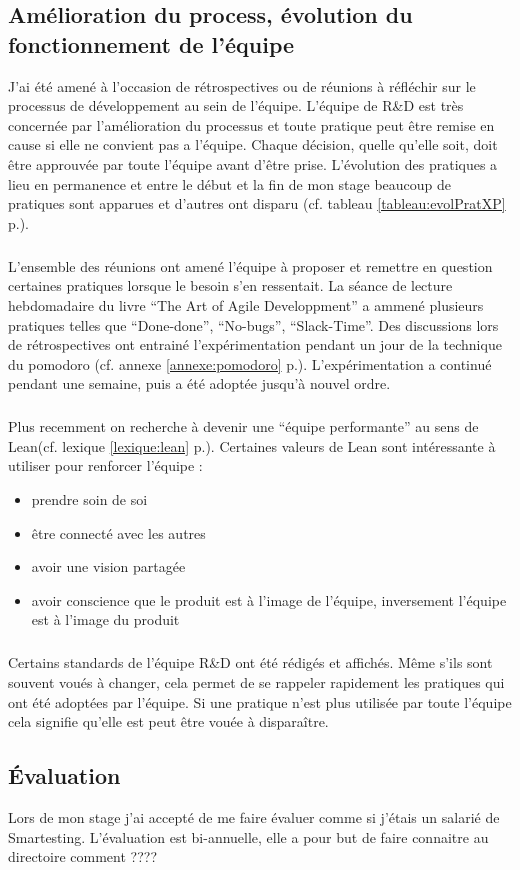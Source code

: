 \subsection{Amélioration du process, évolution du fonctionnement de l'équipe}
J'ai été amené à l'occasion de rétrospectives ou de réunions à réfléchir sur le processus de développement au sein de l'équipe. L'équipe de R\&D est très concernée par l'amélioration du processus et toute pratique peut être remise en cause si elle ne convient pas a l'équipe. Chaque décision, quelle qu'elle soit, doit être approuvée par toute l'équipe avant d'être prise. L'évolution des pratiques a lieu en permanence et entre le début et la fin de mon stage beaucoup de pratiques sont apparues et d'autres ont disparu (cf. tableau \ref{tableau:evolPratXP} p.\pageref{tableau:evolPratXP}).
\subparagraph*{}
L'ensemble des réunions ont amené l'équipe à proposer et remettre en question certaines pratiques lorsque le besoin s'en ressentait. La séance de lecture hebdomadaire du livre ``The Art of Agile Developpment'' a ammené plusieurs pratiques telles que ``Done-done'', ``No-bugs'', ``Slack-Time''. Des discussions lors de rétrospectives ont entrainé l'expérimentation pendant un jour de la technique du pomodoro (cf. annexe \ref{annexe:pomodoro} p.\pageref{annexe:pomodoro}). L'expérimentation a continué pendant une semaine, puis a été adoptée jusqu'à nouvel ordre.

\subparagraph*{}
Plus recemment on recherche à devenir une ``équipe performante'' au sens de Lean(cf. lexique \ref{lexique:lean} p.\pageref{lexique:lean}). Certaines valeurs de Lean sont intéressante à utiliser pour renforcer l'équipe :
\begin{itemize}
\item prendre soin de soi
\item être connecté avec les autres
\item avoir une vision partagée
\item avoir conscience que le produit est à l'image de l'équipe, inversement l'équipe est à l'image du produit
\end{itemize}
\subparagraph*{}
Certains standards de l'équipe R\&D ont été rédigés et affichés. Même s'ils sont souvent voués à changer, cela permet de se rappeler rapidement les pratiques qui ont été adoptées par l'équipe. Si une pratique n'est plus utilisée par toute l'équipe cela signifie qu'elle est peut être vouée à disparaître.
\subsection{Évaluation}
Lors de mon stage j'ai accepté de me faire évaluer comme si j'étais un salarié de Smartesting. L'évaluation est bi-annuelle, elle a pour but de faire connaitre au directoire comment ????